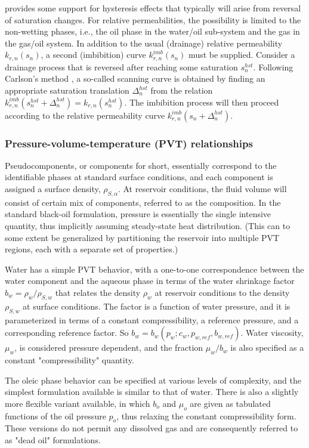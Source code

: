 \opmflow provides some support for hysteresis effects \citep{killough1976hysteresis} that
typically will arise from reversal of saturation changes.  For relative permeabilities,
the possibility is limited to the non-wetting phases, i.e., the oil phase in the water/oil
sub-system and the gas in the gas/oil system.  In addition to the usual (drainage)
relative permeability $k_{r,n}(s_{n})$, a second (imbibition) curve $k_{r,n}^{imb}(s_{n})$
must be supplied.  Consider a drainage process that is reversed after reaching some
saturation $s_{n}^{hst}$.  Following Carlson's method \citep{carlson1981hysteresis}, a
so-called scanning curve is obtained by finding an appropriate saturation translation
$\Delta_{n}^{hst}$ from the relation
$k_{r,n}^{imb}(s_{n}^{hst}+\Delta_{n}^{hst})=k_{r,n}(s_{n}^{hst})$.  The imbibition
process will then proceed according to the relative permeability curve
$k_{r,n}^{imb}(s_{n}+\Delta_{n}^{hst})$.
 

\subsubsection{Pressure-volume-temperature (PVT) relationships}\label{sec:pvt}

Pseudocomponents, or components for short, essentially correspond to the identifiable
phases at standard surface conditions, and each component is assigned a surface density,
$\rho_{S,\alpha}$.  At reservoir conditions, the fluid volume will consist of certain mix
of components, referred to as the composition.  In the standard black-oil formulation,
pressure is essentially the single intensive quantity, thus implicitly assuming
steady-state heat distribution.  (This can to some extent be generalized by partitioning
the reservoir into multiple PVT regions, each with a separate set of properties.)

Water has a simple PVT behavior, with a one-to-one correspondence between the
water component and the aqueous phase in terms of the water shrinkage factor
$b_w=\rho_w/\rho_{S,w}$ that relates the density $\rho_w$ at reservoir conditions to the density $\rho_{S,w}$ at surface conditions. The factor is a function of water pressure, and it is parameterized in terms of 
a constant compressibility, a reference pressure, and a corresponding
reference factor. So $b_w = b_w(p_w; c_w,p_{w,ref},b_{w,ref})$.
Water viscosity, $\mu_w$, is considered pressure dependent, and the fraction $\mu_w/b_w$ is 
also specified as a constant "compressibility" quantity.

The oleic phase behavior can be specified at various levels of complexity, and the
simplest formulation available is similar to that of water.  There is also a slightly
more flexible variant available, in which $b_o$ and $\mu_o$ are given as tabulated
functions of the oil pressure $p_o$, thus relaxing the constant compressibility form.
These versions do not permit any dissolved gas and are consequently referred to as "dead
oil" formulations.

